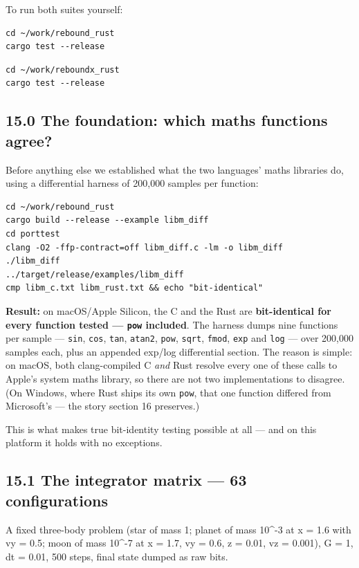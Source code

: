 \documentclass[11pt]{article}
\begin{document}
To run both suites yourself:

\begin{lstlisting}
cd ~/work/rebound_rust
cargo test --release
\end{lstlisting}

\begin{lstlisting}
cd ~/work/reboundx_rust
cargo test --release
\end{lstlisting}

\subsection{15.0 The foundation: which maths functions agree?}

Before anything else we established what the two languages' maths libraries do, using a differential harness of 200,000 samples per function:

\begin{lstlisting}
cd ~/work/rebound_rust
cargo build --release --example libm_diff
cd porttest
clang -O2 -ffp-contract=off libm_diff.c -lm -o libm_diff
./libm_diff
../target/release/examples/libm_diff
cmp libm_c.txt libm_rust.txt && echo "bit-identical"
\end{lstlisting}

\textbf{Result:} on macOS/Apple Silicon, the C and the Rust are \textbf{bit-identical for every function tested --- \texttt{pow} included}. The harness dumps nine functions per sample --- \texttt{sin}, \texttt{cos}, \texttt{tan}, \texttt{atan2}, \texttt{pow}, \texttt{sqrt}, \texttt{fmod}, \texttt{exp} and \texttt{log} --- over 200,000 samples each, plus an appended exp/log differential section. The reason is simple: on macOS, both clang-compiled C \emph{and} Rust resolve every one of these calls to Apple's system maths library, so there are not two implementations to disagree. (On Windows, where Rust ships its own \texttt{pow}, that one function differed from Microsoft's --- the story section 16 preserves.)

This is what makes true bit-identity testing possible at all --- and on this platform it holds with no exceptions.

\subsection{15.1 The integrator matrix --- 63 configurations}

A fixed three-body problem (star of mass 1; planet of mass 10\textasciicircum{}-3 at x = 1.6 with vy = 0.5; moon of mass 10\textasciicircum{}-7 at x = 1.7, vy = 0.6, z = 0.01, vz = 0.001), G = 1, dt = 0.01, 500 steps, final state dumped as raw bits.
\end{document}
